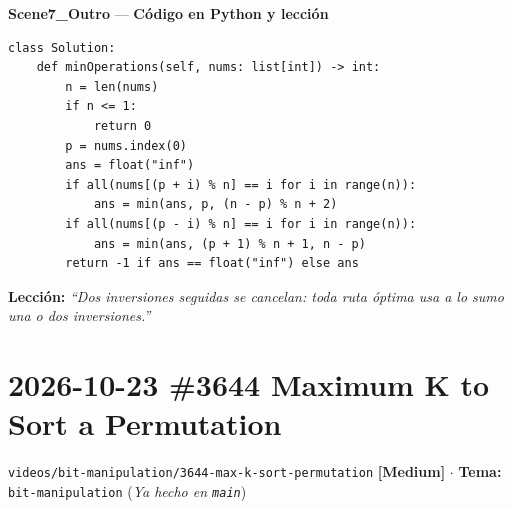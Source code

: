 \documentclass[letterpaper,10pt]{article}
\newcommand{\scene}[2]{\noindent\textbf{\textcolor{mcaqua}{#1}} --- \textbf{#2}\par\vspace{1pt}}
\newcommand{\folder}[1]{\texttt{\textcolor{mcgreen}{#1}}}
\newcommand{\badge}[2]{\textbf{\textcolor{#1}{[#2]}}}
\begin{document}
\scene{Scene7\_Outro}{C\'odigo en Python y lecci\'on}
\begin{Verbatim}[frame=single,fontsize=\small]
class Solution:
    def minOperations(self, nums: list[int]) -> int:
        n = len(nums)
        if n <= 1:
            return 0
        p = nums.index(0)
        ans = float("inf")
        if all(nums[(p + i) % n] == i for i in range(n)):
            ans = min(ans, p, (n - p) % n + 2)
        if all(nums[(p - i) % n] == i for i in range(n)):
            ans = min(ans, (p + 1) % n + 1, n - p)
        return -1 if ans == float("inf") else ans
\end{Verbatim}
\textbf{Lecci\'on:} \textit{``Dos inversiones seguidas se cancelan: toda ruta \'optima usa a lo sumo una o dos inversiones.''}

\newpage

\section{2026-10-23 \textbar{} \#3644 Maximum K to Sort a Permutation}
\folder{videos/bit-manipulation/3644-max-k-sort-permutation} \hfill \badge{mcgold}{Medium} $\cdot$ \textbf{Tema:} \texttt{bit-manipulation} (\textit{Ya hecho en \texttt{main}})
\end{document}
